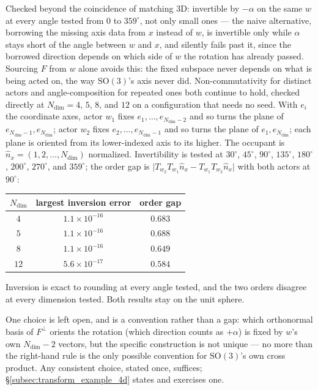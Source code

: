 \documentclass[12pt, a4paper]{article}
\begin{document}
Checked beyond the coincidence of matching 3D: invertible by
$-\alpha$ on the same $w$ at every angle tested from $0$ to
$359^\circ$, not only small ones --- the naive alternative, borrowing
the missing axis data from $x$ instead of $w$, is invertible only
while $\alpha$ stays short of the angle between $w$ and $x$, and
silently fails past it, since the borrowed direction depends on
which side of $w$ the rotation has already passed. Sourcing $F$ from
$w$ alone avoids this: the fixed subspace never depends on what is
being acted on, the way $\mathrm{SO}(3)$'s axis never did.
Non-commutativity for distinct actors and angle-composition for
repeated ones both continue to hold, checked directly at
$N_{\mathrm{dim}}=4$, $5$, $8$, and $12$ on a configuration that
needs no seed. With $e_i$ the coordinate axes, actor $w_1$ fixes
$e_1,\ldots,e_{N_{\mathrm{dim}}-2}$ and so turns the plane of
$e_{N_{\mathrm{dim}}-1},e_{N_{\mathrm{dim}}}$; actor $w_2$ fixes
$e_2,\ldots,e_{N_{\mathrm{dim}}-1}$ and so turns the plane of
$e_1,e_{N_{\mathrm{dim}}}$; each plane is oriented from its
lower-indexed axis to its higher. The occupant is
$\hat n_x=(1,2,\ldots,N_{\mathrm{dim}})$ normalized. Invertibility is
tested at $30^\circ$, $45^\circ$, $90^\circ$, $135^\circ$,
$180^\circ$, $200^\circ$, $270^\circ$, and $359^\circ$; the order
gap is $\lvert T_{w_2}T_{w_1}\hat n_x-T_{w_1}T_{w_2}\hat n_x\rvert$
with both actors at $90^\circ$:
\begin{center}
\begin{tabular}{ccc}
$N_{\mathrm{dim}}$ & largest inversion error & order gap \\
\hline
$4$ & $1.1\times10^{-16}$ & $0.683$ \\
$5$ & $1.1\times10^{-16}$ & $0.688$ \\
$8$ & $1.1\times10^{-16}$ & $0.649$ \\
$12$ & $5.6\times10^{-17}$ & $0.584$ \\
\end{tabular}
\end{center}
Inversion is exact to rounding at every angle tested, and the two
orders disagree at every dimension tested. Both results stay on the unit sphere.

One choice is left open, and is a convention rather than a gap:
which orthonormal basis of $F^\perp$ orients the rotation (which
direction counts as $+\alpha$) is fixed by $w$'s own
$N_{\mathrm{dim}}-2$ vectors, but the specific construction is not
unique --- no more than the right-hand rule is the only possible
convention for $\mathrm{SO}(3)$'s own cross product. Any consistent
choice, stated once, suffices; \S\ref{subsec:transform_example_4d}
states and exercises one.
\end{document}
